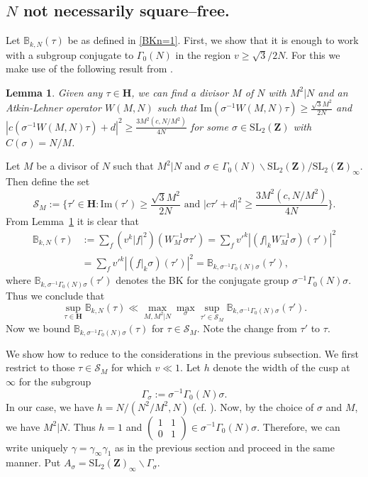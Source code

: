 \documentclass[11pt]{amsart}
\numberwithin{equation}{section}
\theoremstyle{plain}
\newtheorem{lem}[thm]{Lemma}
\theoremstyle{definition}
\newcommand{\lemref}[1]{Lemma~\ref{#1}}
\newcommand{\h}{\mf H}
\newcommand{\mbb}{\mathbb}
\newcommand{\mf}{\mathbf}
\newcommand{\mc}{\mathcal}
\newcommand{\mrm}{\mathrm}
\newcommand{\im}{\mrm{Im}}
\newcommand{\sumn}{\sum \nolimits}
\newcommand{\smat}[4]{\left( \begin{smallmatrix}#1&#2\\#3&#4\end{smallmatrix}\right)}
\newcommand{\sltwo}{\mrm{SL}_2(\mf Z)}
\begin{document}
\subsection{\texorpdfstring{$N$}{N} not necessarily square--free.}
    Let $\mbb B_{k,N}(\tau)$ be as defined in \eqref{BKn=1}. First, we show that it is enough to work with a subgroup conjugate to $\Gamma_0(N)$ in the region $v\ge \sqrt{3}/2N$. For this we make use of the following result from \cite{saha2017sup}.

\begin{lem}\cite{saha2017sup}\label{lemSaha}
    Given any $\tau\in \h$, we can find a divisor $M$ of $N$ with $M^2|N$ and an Atkin-Lehner operator $W(M,N)$ such that $\im (\sigma^{-1} W(M,N) \tau)\ge \frac{\sqrt{3}M^2}{2N}$ and $|c(\sigma^{-1} W(M,N) \tau)+d |^2 \ge \frac{3M^2(c, N/M^2)}{4N}$ for some $\sigma\in\sltwo$ with $C(\sigma)=N/M$.
\end{lem}
Let $M$ be a divisor of $N$ such that $M^2|N$ and $\sigma\in \Gamma_0(N)\backslash\sltwo/\sltwo_\infty$. Then define the set
\begin{equation}
   \mc S_M:=\{ \tau' \in\h :  \im ( \tau')\ge \frac{\sqrt{3}M^2}{2N} \text{ and } |c \tau'+d |^2 \ge \frac{3M^2(c, N/M^2)}{4N} \}.
\end{equation}
From \lemref{lemSaha} it is clear that
\begin{align}
   \mbb B_{k,N}(\tau) &:= \sumn_{f }\left( v^k |f|^2 \right) (W_M^{-1} \sigma \tau') = \sumn_{f }v'^k \left| (f|_k W_M^{-1} \sigma) (\tau')\right|^2 \\
   & = \sumn_{f}  v'^k \left| (f|_k  \sigma) (\tau')\right|^2 = \mbb B_{k,\sigma^{-1} \Gamma_0(N) \sigma}(\tau'),
\end{align}
where $\mbb B_{k,\sigma^{-1} \Gamma_0(N) \sigma}(\tau')$ denotes the BK for the conjugate group $\sigma^{-1} \Gamma_0(N) \sigma$.
Thus we conclude that 
\begin{equation}
    \sup_{\tau\in \h} \mbb B_{k,N}(\tau)\ll \max_{M, M^2|N} \max_{\sigma }\sup_{\tau' \in \mc S_{ M}} \mbb B_{k,\sigma^{-1} \Gamma_0(N) \sigma}(\tau').
\end{equation}
Now we bound $\mbb B_{k,\sigma^{-1} \Gamma_0(N) \sigma}(\tau)$ for $\tau\in \mc S_M$. Note the change from $\tau'$ to $\tau$. 

We show how to reduce to the considerations in the previous subsection.
We first restrict to those $\tau \in \mc S_M$ for which $v \ll 1$.
Let $h$ denote the width of the cusp at $\infty$ for the subgroup
\[ \Gamma_\sigma:=\sigma^{-1} \Gamma_0(N) \sigma.\]
In our case, we have $h= N/(N^2/M^2, N)$ (cf. \cite{saha2017sup}). Now, by the choice of $\sigma$ and $M$, we have $M^2|N$. Thus $h=1$ and $\smat{1}{1}{0}{1}\in\sigma^{-1} \Gamma_0(N) \sigma$. Therefore, we can write uniquely $\gamma = \gamma_\infty \gamma_1$ as in the previous section and proceed in the same manner. 
Put $A_\sigma = \sltwo_\infty \backslash \Gamma_\sigma$.
\end{document}
